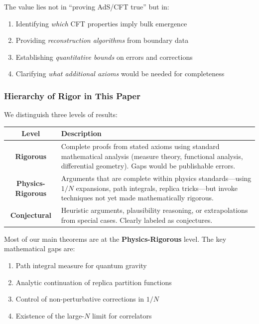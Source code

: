 \documentclass[12pt,a4paper]{article}
\begin{document}
The value lies not in ``proving AdS/CFT true'' but in:
\begin{enumerate}
    \item Identifying \emph{which} CFT properties imply bulk emergence
    \item Providing \emph{reconstruction algorithms} from boundary data
    \item Establishing \emph{quantitative bounds} on errors and corrections
    \item Clarifying \emph{what additional axioms} would be needed for completeness
\end{enumerate}

\subsubsection{Hierarchy of Rigor in This Paper}

We distinguish three levels of results:

\begin{center}
\begin{tabular}{|c|p{10cm}|}
\hline
\textbf{Level} & \textbf{Description} \\
\hline
\textbf{Rigorous} & Complete proofs from stated axioms using standard mathematical analysis (measure theory, functional analysis, differential geometry). Gaps would be publishable errors. \\
\hline
\textbf{Physics-Rigorous} & Arguments that are complete within physics standards---using $1/N$ expansions, path integrals, replica tricks---but invoke techniques not yet made mathematically rigorous. \\
\hline
\textbf{Conjectural} & Heuristic arguments, plausibility reasoning, or extrapolations from special cases. Clearly labeled as conjectures. \\
\hline
\end{tabular}
\end{center}

Most of our main theorems are at the \textbf{Physics-Rigorous} level. The key mathematical gaps are:
\begin{enumerate}
    \item Path integral measure for quantum gravity
    \item Analytic continuation of replica partition functions
    \item Control of non-perturbative corrections in $1/N$
    \item Existence of the large-$N$ limit for correlators
\end{enumerate}
\end{document}
